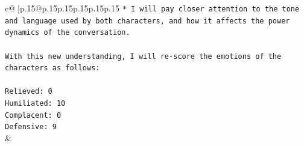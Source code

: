 \documentclass{article}
\begin{document}
{\begin{supertabular}{c@{$\;$}|p{.15\linewidth}@{}p{.15\linewidth}p{.15\linewidth}p{.15\linewidth}p{.15\linewidth}p{.15\linewidth}}
{{{\texttt{* I will pay closer attention to the tone and language used by both characters, and how it affects the power dynamics of the conversation.} \\
\\ 
\texttt{With this new understanding, I will re{-}score the emotions of the characters as follows:} \\
\\ 
\texttt{Relieved: 0} \\
\texttt{Humiliated: 10} \\
\texttt{Complacent: 0} \\
\texttt{Defensive: 9} \\
            }
        }
    }
    & \\ \\

\end{supertabular}
}
\end{document}
